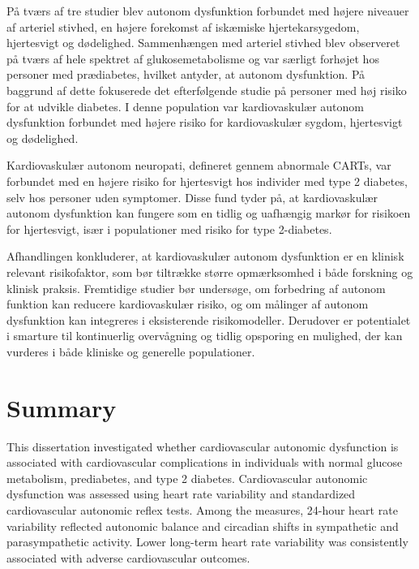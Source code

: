 \documentclass[
  a4paper,
  headsepline=true,
  open=any]{scrbook}
\begin{document}
På tværs af tre studier blev autonom dysfunktion forbundet med højere
niveauer af arteriel stivhed, en højere forekomst af iskæmiske
hjertekarsygedom, hjertesvigt og dødelighed. Sammenhængen med arteriel
stivhed blev observeret på tværs af hele spektret af glukosemetabolisme
og var særligt forhøjet hos personer med prædiabetes, hvilket antyder,
at autonom dysfunktion. På baggrund af dette fokuserede det
efterfølgende studie på personer med høj risiko for at udvikle diabetes.
I denne population var kardiovaskulær autonom dysfunktion forbundet med
højere risiko for kardiovaskulær sygdom, hjertesvigt og dødelighed.

Kardiovaskulær autonom neuropati, defineret gennem abnormale CARTs, var
forbundet med en højere risiko for hjertesvigt hos individer med type 2
diabetes, selv hos personer uden symptomer. Disse fund tyder på, at
kardiovaskulær autonom dysfunktion kan fungere som en tidlig og
uafhængig markør for risikoen for hjertesvigt, især i populationer med
risiko for type 2-diabetes.

Afhandlingen konkluderer, at kardiovaskulær autonom dysfunktion er en
klinisk relevant risikofaktor, som bør tiltrække større opmærksomhed i
både forskning og klinisk praksis. Fremtidige studier bør undersøge, om
forbedring af autonom funktion kan reducere kardiovaskulær risiko, og om
målinger af autonom dysfunktion kan integreres i eksisterende
risikomodeller. Derudover er potentialet i smarture til kontinuerlig
overvågning og tidlig opsporing en mulighed, der kan vurderes i både
kliniske og generelle populationer.

\newpage


\hypertarget{summary}{%
\chapter{Summary}\label{summary}}

This dissertation investigated whether cardiovascular autonomic
dysfunction is associated with cardiovascular complications in
individuals with normal glucose metabolism, prediabetes, and type 2
diabetes. Cardiovascular autonomic dysfunction was assessed using heart
rate variability and standardized cardiovascular autonomic reflex tests.
Among the measures, 24-hour heart rate variability reflected autonomic
balance and circadian shifts in sympathetic and parasympathetic
activity. Lower long-term heart rate variability was consistently
associated with adverse cardiovascular outcomes.
\end{document}
